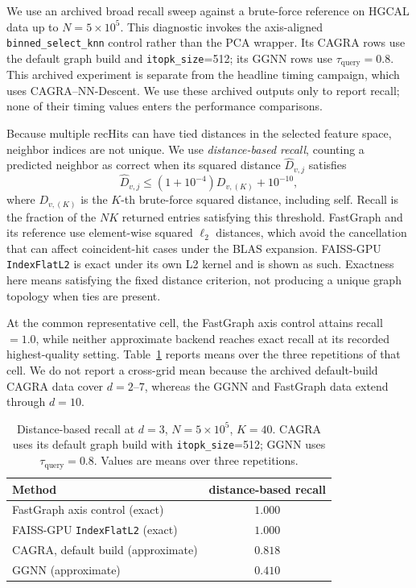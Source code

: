 \documentclass[final,3p,11pt]{elsarticle}
\begin{document}
We use an archived broad recall sweep against a brute-force reference on
HGCAL data up to $N{=}5\times 10^5$. This diagnostic invokes the
axis-aligned \texttt{binned\_select\_knn} control rather than the PCA wrapper.
Its CAGRA rows use the default graph build and \texttt{itopk\_size}=512;
its GGNN rows use $\tau_{\text{query}}=0.8$. This archived experiment is
separate from the headline timing campaign, which uses CAGRA--NN-Descent.
We use these archived outputs only to report recall; none of their timing
values enters the performance comparisons.

Because multiple recHits can have tied distances in the selected feature
space, neighbor indices are not unique.
We use \emph{distance-based recall}, counting a predicted neighbor as correct
when its squared distance $\widehat{D}_{v,j}$ satisfies
\[
 \widehat{D}_{v,j} \le (1+10^{-4})D_{v,(K)}+10^{-10},
\]
where $D_{v,(K)}$ is the $K$-th brute-force squared distance, including
self. Recall is the fraction of the $NK$ returned entries satisfying
this threshold. FastGraph and its reference use element-wise squared
$\ell_2$ distances, which avoid the cancellation that can affect coincident-hit
cases under the BLAS expansion. FAISS-GPU \texttt{IndexFlatL2} is exact under
its own L2 kernel and is shown as such. Exactness here means satisfying the
fixed distance criterion, not producing a unique graph topology when ties are
present.

At the common representative cell, the FastGraph axis control attains recall
$=1.0$, while neither approximate backend reaches exact recall at its recorded
highest-quality setting. Table~\ref{tab:recall} reports means over the three
repetitions of that cell. We do not report a cross-grid mean because the
archived default-build CAGRA data cover $d=2$--$7$, whereas the GGNN and
FastGraph data extend through $d=10$.

\begin{table}[!htbp]
\centering
\caption{Distance-based recall at $d{=}3$, $N{=}5\times10^5$,
$K{=}40$. CAGRA uses its default graph build with
\texttt{itopk\_size}=512; GGNN uses $\tau_{\text{query}}=0.8$.
Values are means over three repetitions.}
\label{tab:recall}
\small
\begin{tabular}{lc}
\toprule
Method & distance-based recall \\
\midrule
FastGraph axis control (exact) & $1.000$ \\
FAISS-GPU \texttt{IndexFlatL2} (exact) & $1.000$ \\
CAGRA, default build (approximate) & $0.818$ \\
GGNN (approximate) & $0.410$ \\
\bottomrule
\end{tabular}
\end{table}
\end{document}
